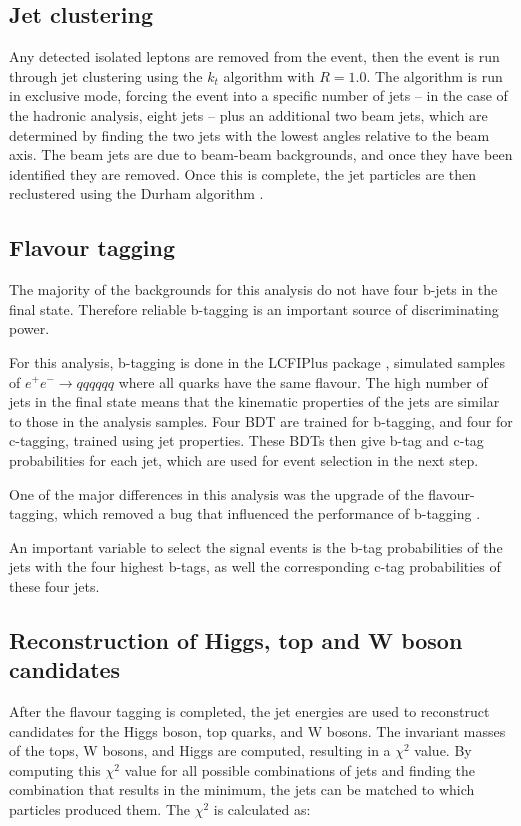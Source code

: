 \subsection{Jet clustering}
Any detected isolated leptons are removed from the event, then the event is run through jet clustering using the $k_t$ algorithm \cite{kt-jet-clustering} with $R = 1.0$. The algorithm is run in exclusive mode, forcing the event into a specific number of jets -- in  the case of the hadronic analysis, eight jets -- plus an additional two beam jets, which are determined by finding the two jets with the lowest angles relative to the beam axis. The beam jets are due to beam-beam backgrounds, and once they have been identified they are removed. Once this is complete, the jet particles are then reclustered using the Durham algorithm \cite{durham-jet-clustering}.

\subsection{Flavour tagging}
\label{section:flavour-tagging}
The majority of the backgrounds for this analysis do not have four b-jets in the final state. Therefore reliable b-tagging is an important source of discriminating power.

For this analysis, b-tagging is done in the LCFIPlus package \cite{lcfiplus}, simulated samples of $e^+ e^- \rightarrow qqqqqq$ where all quarks have the same flavour. The high number of jets in the final state means that the kinematic properties of the jets are similar to those in the analysis samples. Four \acrfull{BDT} are trained for b-tagging, and four for c-tagging, trained using jet properties. These \acrshort{BDT}s then give b-tag and c-tag probabilities for each jet, which are used for event selection in the next step.

One of the major differences in this analysis was the upgrade of the flavour-tagging, which removed a bug that influenced the performance of b-tagging \cite{clic-yukawa-coupling-2014}.

An important variable to select the signal events is the b-tag probabilities of the jets with the four highest b-tags, as well the corresponding c-tag probabilities of these four jets.

\subsection{Reconstruction of Higgs, top and W boson candidates}
\label{section:chi-squared}
After the flavour tagging is completed, the jet energies are used to reconstruct candidates for the Higgs boson, top quarks, and W bosons. The invariant masses of the tops, W bosons, and Higgs are computed, resulting in a $\chi^2$ value. By computing this $\chi^2$ value for all possible combinations of jets and finding the combination that results in the minimum, the jets can be matched to which particles produced them. The $\chi^2$ is calculated as:

